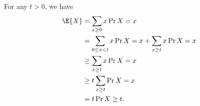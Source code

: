 \starred
For any $t>0$, we have
\begin{align*}
    \E{X} &= \sum_{x\ge0}x\Pr{X=x} \\
    &= \sum_{0\le x<t}x\Pr{X=x}+\sum_{x\ge t}x\Pr{X=x} \\
    &\ge \sum_{x\ge t}x\Pr{X=x} \\
    &\ge t\sum_{x\ge t}\Pr{X=x} \\
    &= t\Pr{X\ge t}.
\end{align*}
